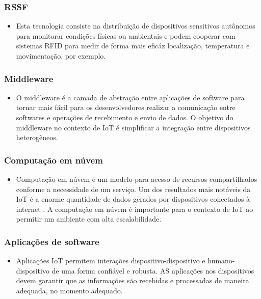 	\subsubsection{\acrfull{RSSF}}
		\begin{itemize}
			\item Esta tecnologia consiste na distribuição de dispositivos sensitivos autônomos para monitorar condições físicas ou
			ambientais e podem cooperar com sistemas \acrshort{RFID} para medir de forma mais eficáz localização, temperatura e movimentação, por exemplo.
			\cite{IOTS}
		\end{itemize}
	\subsubsection{Middleware}
		\begin{itemize}
			\item O middleware é a camada de abstração entre aplicações de software para tornar mais fácil para os desenvolvedores
			 realizar a comunicação entre softwares e operações de recebimento e envio de dados. O objetivo do middleware no contexto
			  de \acrshort{IoT} é simplificar a integração entre dispositivos heterogêneos.
		\end{itemize}
	\subsubsection{Computação em núvem}
		\begin{itemize}
			\item Computação em núvem é um modelo para acesso de recursos compartilhados conforme a necessidade de um serviço. Um dos resultados mais notáveis
			da \acrshort{IoT} é a enorme quantidade de dados gerados por dispositivos conectados à internet \cite{IOTV}. A computação em núvem é importante para o contexto de \acrlong{IoT}
			ao permitir um ambiente com alta escalabilidade.
		\end{itemize}
	\subsubsection{Aplicações de software}
		\begin{itemize}
			\item Aplicações \acrshort{IoT} permitem interações dispositivo-dispositivo e humano-dispositivo de uma forma confiável e robusta.
			AS aplicações nos dispositivos devem garantir que as informações são recebidas e processadas de maneira adequada, no momento
			adequado.

		\end{itemize}

